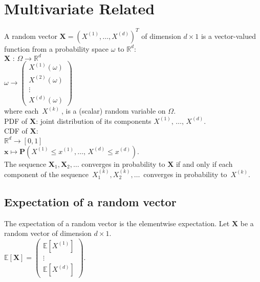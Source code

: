 \section{Multivariate Related}


A random vector $\mathbf X= \left(X^{(1)},\dots ,X^{(d)}\right)^ T$ of dimension $d \times 1$ is a vector-valued function from a probability space $\omega$ to $\mathbb {R}^ d$:\\

$  \mathbf{X}\, \, :\,  \Omega \longrightarrow   \mathbb {R}^ d$\\

$ \omega  \longrightarrow  \begin{pmatrix}  X^{(1)}(\omega ) \\ X^{(2)}(\omega )\\ \vdots \\ X^{(d)}(\omega )\end{pmatrix}$\\

where each $\, X^{(k)}\ $, is a (scalar) random variable on $\Omega$. \\

PDF of $\mathbf X$: joint distribution of its components $X^{(1)},\, \ldots ,\, X^{(d)}$. \\

CDF of $\mathbf X$:\\

$\mathbb {R}^ d \rightarrow   [0,1]$\\

$ \mathbf{x}  \mapsto   \mathbf{P}(X^{(1)}\leq x^{(1)},\ldots ,\, X^{(d)}\leq x^{(d)}).$\\

The sequence $\mathbf{X}_1, \mathbf{X}_2,\ldots$ converges in probability to $\mathbf{X}$ if and only if each component of the sequence $\, X_1^{(k)},X_2^{(k)},\ldots \,$ converges in probability to $\, X^{(k)}$.


\subsection*{Expectation of a random vector}
The expectation of a random vector is the elementwise expectation. Let $\mathbf X$  be a random vector of dimension $d \times 1$.\\

$   \mathbb E[\mathbf X] =  \begin{pmatrix} \mathbb E[X^{(1)}]\\ \vdots \\ \mathbb E[X^{(d)}]\end{pmatrix}.$\\


